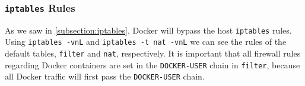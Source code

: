 \subsubsection{\texorpdfstring{\lstinline{iptables}}{iptables} Rules}\label{subsubsection:iptables-host}
As we saw in \autoref{subsection:iptables}, Docker will bypass the host \lstinline{iptables} rules. Using \lstinline{iptables -vnL} and \lstinline{iptables -t nat -vnL} we can see the rules of the default tables, \lstinline{filter} and \lstinline{nat}, respectively. It is important that all firewall rules regarding Docker containers are set in the \lstinline{DOCKER-USER} chain in \lstinline{filter}, because all Docker traffic will first pass the \lstinline{DOCKER-USER} chain.
